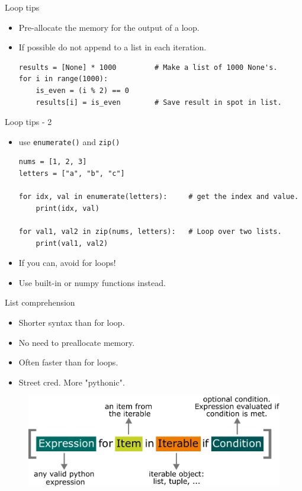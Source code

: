 \documentclass[compress%
,aspectratio=169%
]{beamer}
\newcommand{\code}{\lstinline}
\begin{document}
\begin{frame}[fragile]{Loop tips}
\begin{itemize}
\small
    \item Pre-allocate the memory for the output of a loop. 
    \item If possible \alert{do not append to a list} in each iteration.
\begin{lstlisting}
results = [None] * 1000         # Make a list of 1000 None's.
for i in range(1000):
    is_even = (i % 2) == 0
    results[i] = is_even        # Save result in spot in list.
\end{lstlisting}
\end{itemize}
\end{frame}

\begin{frame}[fragile]{Loop tips - 2}
\begin{itemize}
    \item use \code|enumerate()| and \code|zip()|
    
\begin{lstlisting}
nums = [1, 2, 3]
letters = ["a", "b", "c"]

for idx, val in enumerate(letters):     # get the index and value.
    print(idx, val)

for val1, val2 in zip(nums, letters):   # Loop over two lists.
    print(val1, val2)
\end{lstlisting}

    \item If you can, \alert{avoid for loops!}
    \item Use built-in or numpy functions instead.
\end{itemize}

\end{frame}




\begin{frame}[fragile]{List comprehension}
    \begin{itemize}
        \item Shorter syntax than for loop.
        \item No need to preallocate memory.
        \item Often faster than for loops.
        \item Street cred. More "pythonic".
    \end{itemize}
    
\begin{figure}
    \centering
    \includegraphics[width=0.6\linewidth]{img/list_comprehension.pdf}
\end{figure}
\end{frame}
\end{document}
